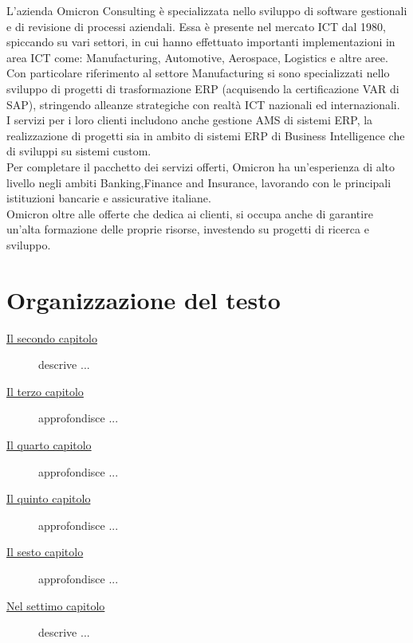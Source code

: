 L’azienda Omicron Consulting è specializzata nello sviluppo di software gestionali e di revisione di processi aziendali. Essa è presente nel mercato ICT dal 1980, spiccando su vari settori, in cui hanno effettuato importanti implementazioni in area ICT come: Manufacturing, Automotive, Aerospace, Logistics e altre aree.
Con particolare riferimento al settore Manufacturing si sono specializzati nello sviluppo di progetti di trasformazione ERP (acquisendo la certificazione VAR di SAP), stringendo alleanze strategiche con realtà ICT nazionali ed internazionali.\\
I servizi per i loro clienti includono anche gestione AMS di sistemi ERP, la realizzazione di progetti sia in ambito di sistemi ERP di Business Intelligence che di sviluppi su sistemi custom.\\
Per completare il pacchetto dei servizi offerti, Omicron ha un’esperienza di alto livello negli ambiti Banking,Finance and Insurance, lavorando con le principali istituzioni bancarie e assicurative italiane.\\
Omicron oltre alle offerte che dedica ai clienti, si occupa anche di garantire un’alta formazione delle proprie risorse, investendo su progetti di ricerca e sviluppo.


\section{Organizzazione del testo}

\begin{description}
    \item[{\hyperref[cap:processi-metodologie]{Il secondo capitolo}}] descrive ...
    
    \item[{\hyperref[cap:descrizione-stage]{Il terzo capitolo}}] approfondisce ...
    
    \item[{\hyperref[cap:analisi-requisiti]{Il quarto capitolo}}] approfondisce ...
    
    \item[{\hyperref[cap:progettazione-codifica]{Il quinto capitolo}}] approfondisce ...
    
    \item[{\hyperref[cap:verifica-validazione]{Il sesto capitolo}}] approfondisce ...
    
    \item[{\hyperref[cap:conclusioni]{Nel settimo capitolo}}] descrive ...
\end{description}

